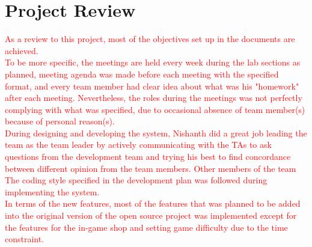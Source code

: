 \documentclass{article}
\begin{document}
\section{Project Review}
\textcolor{red}{As a review to this project, most of the objectives set up in the documents are achieved.\\
To be more specific, the meetings are held every week during the lab sections as planned, meeting agenda was made before each meeting with the specified format, and every team member had clear idea about what was his "homework" after each meeting. Nevertheless, the roles during the meetings was not perfectly complying with what was specified, due to occasional absence of team member(s) because of personal reason(s).\\
During designing and developing the system, Nishanth did a great job leading the team as the team leader by actively communicating with the TAs to ask questions from the development team and trying his best to find concordance between different opinion from the team members. Other members of the team 
The coding style specified in the development plan was followed during implementing the system.\\
In terms of the new features, most of the features that was planned to be added into the original version of the open source project was implemented except for the features for the in-game shop and setting game difficulty due to the time constraint. }
\end{document}
